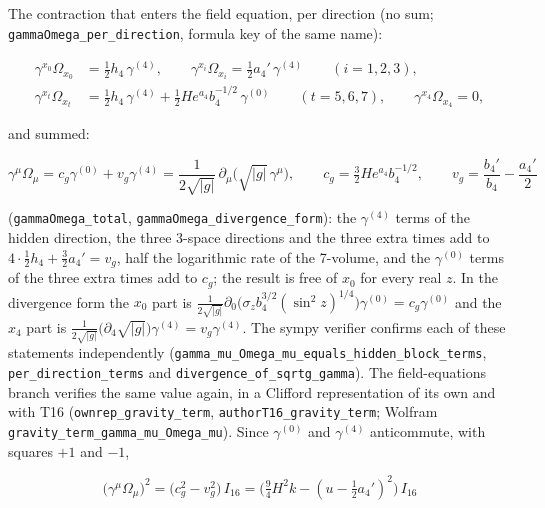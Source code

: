 \documentclass[11pt]{article}
\begin{document}
The contraction that enters the field equation, per direction (no sum; \texttt{gammaOme\allowbreak{}ga\_per\_d\allowbreak{}irection}, formula key of the same name):

\[
\begin{aligned}
\gamma^{x_0}\Omega_{x_0} &= \tfrac12 h_4\,\gamma^{(4)}, \qquad \gamma^{x_i}\Omega_{x_i} = \tfrac12 a_4'\,\gamma^{(4)} \qquad (i = 1, 2, 3), \\
\gamma^{x_t}\Omega_{x_t} &= \tfrac12 h_4\,\gamma^{(4)} + \tfrac12He^{a_4}b_4^{-1/2}\,\gamma^{(0)} \qquad (t = 5, 6, 7), \qquad \gamma^{x_4}\Omega_{x_4} = 0,
\end{aligned}
\]

and summed:

\[
\gamma^\mu\Omega_\mu = c_g\gamma^{(0)} + v_g\gamma^{(4)} = \frac{1}{2\sqrt{|g|}}\,\partial_\mu\big(\sqrt{|g|}\,\gamma^\mu\big),\qquad c_g = \tfrac32He^{a_4}b_4^{-1/2},\qquad v_g = \frac{b_4'}{b_4} - \frac{a_4'}{2}
\]

(\texttt{gammaOme\allowbreak{}ga\_total}, \texttt{gammaOme\allowbreak{}ga\_diver\allowbreak{}gence\_fo\allowbreak{}rm}): the $\gamma^{(4)}$ terms of the hidden direction, the three 3-space directions and the three extra times add to $4\cdot\tfrac12h_4 + \tfrac32a_4' = v_g$, half the logarithmic rate of the 7-volume, and the $\gamma^{(0)}$ terms of the three extra times add to $c_g$; the result is free of $x_0$ for every real $z$. In the divergence form the $x_0$ part is $\frac{1}{2\sqrt{|g|}}\partial_0\big(\sigma_zb_4^{3/2}(\sin^2 z)^{1/4}\big)\gamma^{(0)} = c_g\gamma^{(0)}$ and the $x_4$ part is $\frac{1}{2\sqrt{|g|}}\big(\partial_4\sqrt{|g|}\big)\gamma^{(4)} = v_g\gamma^{(4)}$. The sympy verifier confirms each of these statements independently (\texttt{gamma\_mu\allowbreak{}\_Omega\_m\allowbreak{}u\_equals\allowbreak{}\_hidden\_\allowbreak{}block\_te\allowbreak{}rms}, \texttt{per\_dire\allowbreak{}ction\_te\allowbreak{}rms} and \texttt{divergen\allowbreak{}ce\_of\_sq\allowbreak{}rtg\_gamm\allowbreak{}a}). The field-equations branch verifies the same value again, in a Clifford representation of its own and with T16 (\texttt{ownrep\_g\allowbreak{}ravity\_t\allowbreak{}erm}, \texttt{authorT1\allowbreak{}6\_gravit\allowbreak{}y\_term}; Wolfram \texttt{gravity\_\allowbreak{}term\_gam\allowbreak{}ma\_mu\_Om\allowbreak{}ega\_mu}). Since $\gamma^{(0)}$ and $\gamma^{(4)}$ anticommute, with squares $+1$ and $-1$,

\[
\big(\gamma^\mu\Omega_\mu\big)^2 = \big(c_g^2 - v_g^2\big)\,I_{16} = \big(\tfrac94H^2k - (u - \tfrac12a_4')^2\big)\,I_{16}
\]
\end{document}
